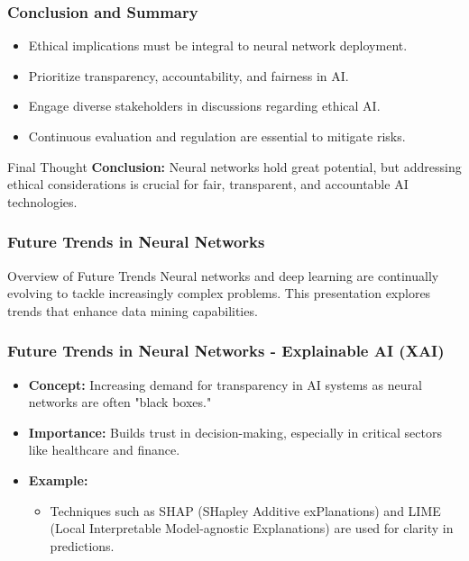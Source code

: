 \documentclass[aspectratio=169]{beamer}
\begin{document}
\begin{frame}[fragile]
    \frametitle{Conclusion and Summary}
    \begin{itemize}
        \item Ethical implications must be integral to neural network deployment.
        \item Prioritize transparency, accountability, and fairness in AI.
        \item Engage diverse stakeholders in discussions regarding ethical AI.
        \item Continuous evaluation and regulation are essential to mitigate risks.
    \end{itemize}
    \begin{block}{Final Thought}
        \textbf{Conclusion:} Neural networks hold great potential, but addressing ethical considerations is crucial for fair, transparent, and accountable AI technologies.
    \end{block}
\end{frame}

\begin{frame}[fragile]
    \frametitle{Future Trends in Neural Networks}
    \begin{block}{Overview of Future Trends}
        Neural networks and deep learning are continually evolving to tackle increasingly complex problems. This presentation explores trends that enhance data mining capabilities.
    \end{block}
\end{frame}

\begin{frame}[fragile]
    \frametitle{Future Trends in Neural Networks - Explainable AI (XAI)}
    \begin{itemize}
        \item \textbf{Concept:} Increasing demand for transparency in AI systems as neural networks are often "black boxes."
        \item \textbf{Importance:} Builds trust in decision-making, especially in critical sectors like healthcare and finance.
        \item \textbf{Example:} 
            \begin{itemize}
                \item Techniques such as SHAP (SHapley Additive exPlanations) and LIME (Local Interpretable Model-agnostic Explanations) are used for clarity in predictions.
            \end{itemize}
    \end{itemize}
\end{frame}
\end{document}
